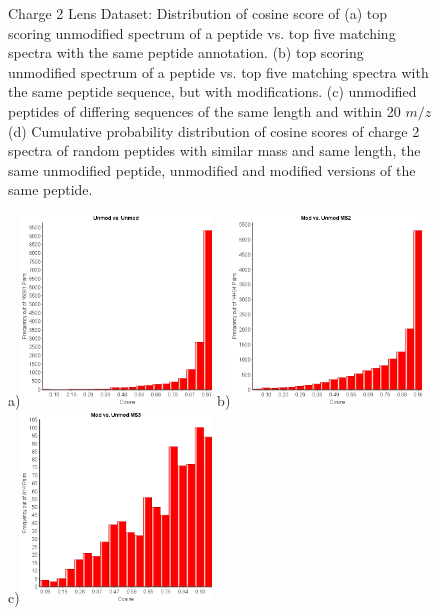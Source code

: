 \begin{figure}[htbp]
\caption{Charge 2 Lens Dataset: Distribution of cosine score of (a) top scoring unmodified spectrum of a peptide vs. top five matching spectra with the same peptide annotation. (b) top scoring unmodified spectrum of a peptide vs. top five matching spectra with the same peptide sequence, but with modifications. (c) unmodified peptides of differing sequences of the same length and within 20 $m/z$ (d) Cumulative probability distribution of cosine scores of charge 2 spectra of random peptides with similar mass and same length, the same unmodified peptide, unmodified and modified versions of the same peptide.}
\label{fig:CosineScoreDist}
\end{figure}

\begin{figure}[htbp]
\centering %
a)\includegraphics[width=2in,height=2in]{fig/phospho/cosine_unmod_vs_unmod.png}
b)\includegraphics[width=2in,height=2in]{fig/phospho/cosine_mod_vs_unmod_ms2.png}
c)\includegraphics[width=2in,height=2in]{fig/phospho/cosine_mod_vs_unmod_ms3.png}

\end{figure}
